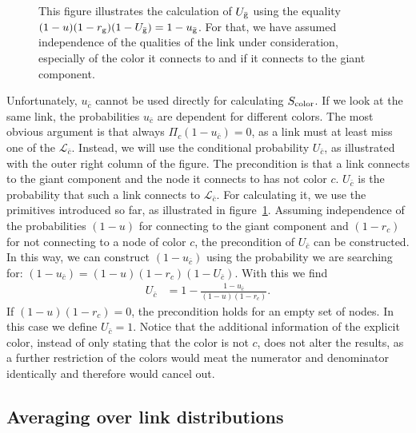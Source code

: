 \documentclass[aps, pre, onecolumn, a4paper, floatfix]{revtex4}
\begin{document}
\begin{figure}[htb]
\begin{minipage}[b]{0.2\linewidth}
\begin{center}
   \end{center}
  \end{minipage}
    \caption{This figure illustrates the calculation of $U_{\bar{\rm g}}$ 
    using the equality $(1-u)(1-r_{\rm g})(1-U_{\bar{\rm g}})=1-u_{\bar{\rm g}}$. For 
    that, we have assumed independence of the qualities of the link under 
    consideration, especially of the color it connects to and if it connects to 
    the giant component. }
    \label{fig:U_c}
\end{figure}
Unfortunately, $u_{\bar c}$ cannot be used directly for calculating $S_{\rm color}$. 
If we look at the same link, 
the probabilities $u_{\bar c}$ are dependent for different colors. 
The most obvious argument is that always $\Pi_c (1-u_{\bar c})=0$, 
as a link must at least miss one of the $\mathcal{L}_{\bar c}$. 
Instead, we will use the conditional probability $U_{\bar c}$, 
as illustrated with the outer right column of the figure. 
The precondition is that a link connects to the giant component 
and the node it connects to has not color $c$. 
$U_{\bar c}$ is the probability that such a link connects to $\mathcal{L}_{\bar c}$. 
For calculating it, we use the primitives introduced so far, 
as illustrated in figure~\ref{fig:U_c}. 
Assuming independence of the probabilities $(1-u)$ for connecting to the giant component 
and $(1-r_c)$ for not connecting to a node of color $c$, 
the precondition of $U_{\bar c}$ can be constructed. 
In this way, we can construct $(1-u_{\bar c})$ using the probability we are searching for: 
$(1-u_{\bar c}) = (1-u)(1-r_c)(1-U_{\bar c})$. With this we find  
\begin{align}
U_{\bar c} &= 1 - \frac{1-u_{\bar c}}{(1-u)(1-r_c)}.\label{eq:U_c}
\end{align}
If $(1-u)(1-r_c)=0$, the precondition holds for an empty set of nodes. 
In this case we define $U_{\bar c}=1$.
Notice that the additional information of the explicit color, instead of only stating that the color 
is not $c$, does not alter the results, as a further restriction of the colors 
would meat the numerator and denominator identically and therefore would cancel out. 





\subsection{Averaging over link distributions}
\end{document}
